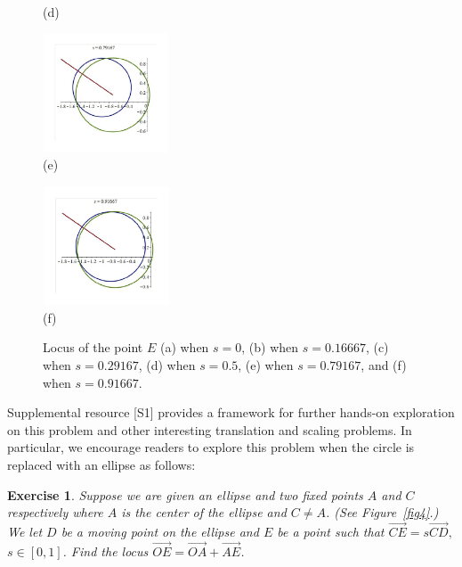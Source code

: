 \documentclass[12pt,a4paper]{article}%
\newtheorem{exercise}[theorem]{Exercise}
\begin{document}
\begin{figure}
\begin{center}
{\begin{center}
\\
(d)
\end{center}}
\qquad
\parbox[b]{1.5in}{\begin{center}
\includegraphics[natheight=2.820600in,natwidth=2.998900in,height=1.3926in,width=1.4795in]{PJH75H16.pdf}
\\
(e)
\end{center}}
\qquad
\parbox[b]{1.5in}{\begin{center}
\includegraphics[natheight=2.713300in,natwidth=2.919900in,height=1.3864in,width=1.491in]{PJH75H17.pdf}
\\
(f)
\end{center}}
\end{center}
\caption{Locus of the point $E$
               (a) when $s=0$, (b) when $s=0.16667$, (c) when  $s=0.29167$,
               (d) when $s=0.5$, (e) when $s=0.79167$, and (f) when $s=0.91667$.}
\label{fig3}
\end{figure}

Supplemental resource [S1] provides a framework for further hands-on
exploration on this problem and other interesting translation and scaling
problems. In particular, we encourage readers to explore this problem
when the circle is replaced with an ellipse as follows:

\begin{exercise} \label{ex2}
Suppose we are given an ellipse and two fixed points $A$ and $C$ respectively
where $A$ is the center of the ellipse and $C\neq A$. (See Figure~\ref{fig4}.)
 We let $D$ be a moving point on the ellipse and $E$ be a point such that
$\overrightarrow{CE}=s\overrightarrow{CD},$ $s\in[0,1]$.
Find the locus $\overrightarrow{OE}=\overrightarrow{OA}+\overrightarrow{AE}$.
\end{exercise}
\end{document}
